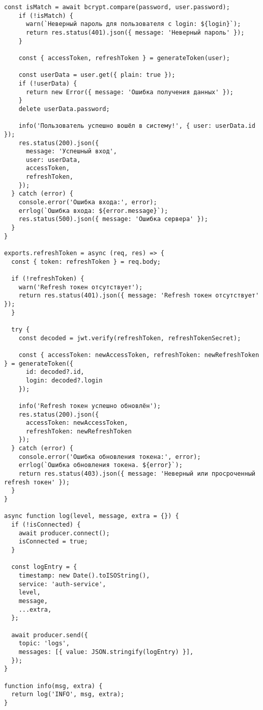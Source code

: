 \begin{lstlisting}[style=CodeListing]
    const isMatch = await bcrypt.compare(password, user.password);
    if (!isMatch) {
      warn(`Неверный пароль для пользователя с login: ${login}`);
      return res.status(401).json({ message: 'Неверный пароль' });
    }

    const { accessToken, refreshToken } = generateToken(user);

    const userData = user.get({ plain: true });
    if (!userData) {
      return new Error({ message: 'Ошибка получения данных' });
    }
    delete userData.password;

    info('Пользователь успешно вошёл в систему!', { user: userData.id });
    res.status(200).json({
      message: 'Успешный вход',
      user: userData,
      accessToken,
      refreshToken,
    });
  } catch (error) {
    console.error('Ошибка входа:', error);
    errlog(`Ошибка входа: ${error.message}`);
    res.status(500).json({ message: 'Ошибка сервера' });
  }
}

exports.refreshToken = async (req, res) => {
  const { token: refreshToken } = req.body;

  if (!refreshToken) {
    warn('Refresh токен отсутствует');
    return res.status(401).json({ message: 'Refresh токен отсутствует' });
  }

  try {
    const decoded = jwt.verify(refreshToken, refreshTokenSecret);

    const { accessToken: newAccessToken, refreshToken: newRefreshToken } = generateToken({
      id: decoded?.id,
      login: decoded?.login
    });

    info('Refresh токен успешно обновлён');
    res.status(200).json({
      accessToken: newAccessToken,
      refreshToken: newRefreshToken
    });
  } catch (error) {
    console.error('Ошибка обновления токена:', error);
    errlog(`Ошибка обновления токена. ${error}`);
    return res.status(403).json({ message: 'Неверный или просроченный refresh токен' });
  }
}

async function log(level, message, extra = {}) {
  if (!isConnected) {
    await producer.connect();
    isConnected = true;
  }

  const logEntry = {
    timestamp: new Date().toISOString(),
    service: 'auth-service',
    level,
    message,
    ...extra,
  };

  await producer.send({
    topic: 'logs',
    messages: [{ value: JSON.stringify(logEntry) }],
  });
}

function info(msg, extra) {
  return log('INFO', msg, extra);
}


\end{lstlisting}

